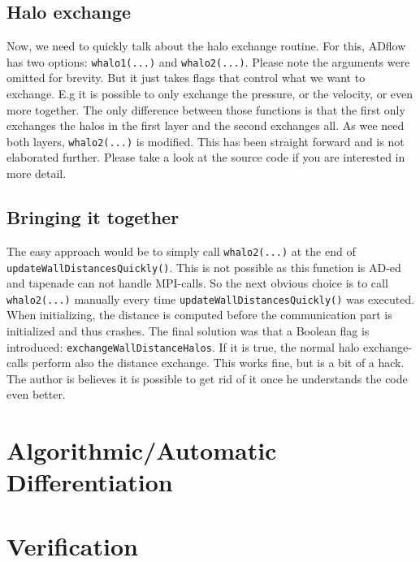 \subsection{Halo exchange}
Now, we need to quickly talk about the halo exchange routine. For this, ADflow
has two options: \texttt{whalo1(...)} and \texttt{whalo2(...)}. Please note the
arguments were omitted for brevity. But it just takes flags that control what
we want to exchange. E.g it is possible to only exchange the pressure, or the
velocity, or even more together. The only difference between those functions is
that the first only exchanges the halos in the first layer and the second
exchanges all. As wee need both layers, \texttt{whalo2(...)} is modified. This
has been straight forward and is not elaborated further. Please take  a look at
the source code if you are interested in more detail.



\subsection{Bringing it together}
The easy approach would be to simply call \texttt{whalo2(...)} at the end of
\texttt{updateWallDistancesQuickly()}. This is not possible as this function is
AD-ed and tapenade can not handle MPI-calls. So the next obvious choice is to
call \texttt{whalo2(...)} manually every time
\texttt{updateWallDistancesQuickly()} was executed. When initializing, the
distance is computed before the communication part is initialized and thus
crashes. The final solution was that a Boolean flag is introduced:
\texttt{exchangeWallDistanceHalos}. If it is true, the normal halo
exchange-calls perform also the distance exchange. This works fine, but is a bit
of a hack. The author is believes it is possible to get rid of it once he
understands the code even better.








\section{Algorithmic/Automatic Differentiation}





\section{Verification}

